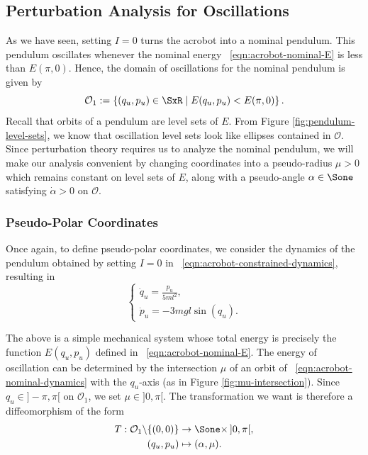 \subsection{Perturbation Analysis for Oscillations}
As we have seen, setting \(I = 0\) turns the acrobot into a nominal pendulum. 
This pendulum oscillates whenever the nominal energy
~\eqref{eqn:acrobot-nominal-E} is less than \(E(\pi,0)\). 
Hence, the domain of oscillations for the nominal pendulum is given by
\[
    \mathcal{O}_1 := \left\{ (q_u,p_u) \in \SxR \mid E(q_u,p_u) < E(\pi,0)\right\}
    .
\]
Recall that orbits of a pendulum are level sets of \(E\). 
From Figure \ref{fig:pendulum-level-sets}, we know that oscillation level sets
look like ellipses contained in \(\mathcal{O}\).
Since perturbation theory requires us to analyze the nominal pendulum, we will
make our analysis convenient by changing coordinates into a
pseudo-radius \(\mu > 0\) which remains constant on level sets of \(E\), 
along with a pseudo-angle \(\alpha \in \Sone\) satisfying \(\dot{\alpha} > 0\) on
\(\mathcal{O}\).

\subsubsection*{Pseudo-Polar Coordinates}

Once again, to define pseudo-polar coordinates, we consider the dynamics of the
pendulum obtained by setting \(I = 0\) in
~\eqref{eqn:acrobot-constrained-dynamics}, resulting in
\begin{equation}\label{eqn:acrobot-nominal-dynamics}
    \begin{cases}
        \dot{q}_u = \frac{p_u}{5ml^2}
        , \\
        \dot{p}_u = -3mgl\sin(q_u)
        . 
    \end{cases}
\end{equation}

The above is a simple mechanical system whose total energy is precisely the
function \(E(q_u,p_u)\) defined in ~\eqref{eqn:acrobot-nominal-E}.
The energy of oscillation can be determined by the intersection
\(\mu\) of an orbit of ~\eqref{eqn:acrobot-nominal-dynamics}
with the \(q_u\)-axis (as in Figure \ref{fig:mu-intersection}).
Since \(q_u \in ]-\pi,\pi[\) on \(\mathcal{O}_1\), we set \(\mu \in ]0,\pi[\).
The transformation we want is therefore a diffeomorphism of the form
\begin{align*}
    T : \mathcal{O}_1 \backslash \{(0,0)\} &\rightarrow \Sone \times \, ]0,\pi[, \\
    (q_u, p_u) &\mapsto (\alpha,\mu)
    .
\end{align*}

